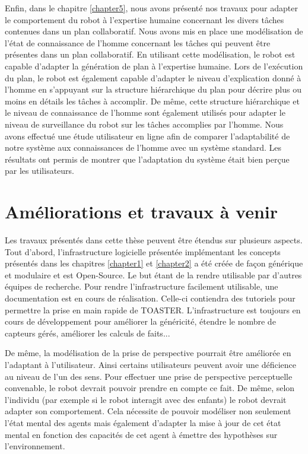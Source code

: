 \documentclass[a4paper,11pt,twoside]{StyleThese}
\begin{document}
Enfin, dans le chapitre \ref{chapter5}, nous avons présenté nos travaux pour adapter le comportement du robot à l'expertise humaine concernant les divers tâches contenues dans un plan collaboratif. Nous avons mis en place une modélisation de l'état de connaissance de l'homme concernant les tâches qui peuvent être présentes dans un plan collaboratif. En utilisant cette modélisation, le robot est capable d'adapter la génération de plan à l'expertise humaine. Lors de l'exécution du plan, le robot est également capable d'adapter le niveau d'explication donné à l'homme en s'appuyant sur la structure hiérarchique du plan pour décrire plus ou moins en détails les tâches à accomplir. De même, cette structure hiérarchique et le niveau de connaissance de l'homme sont également utilisés pour adapter le niveau de surveillance du robot sur les tâches accomplies par l'homme. Nous avons effectué une étude utilisateur en ligne afin de comparer l'adaptabilité de notre système aux connaissances de l'homme avec un système standard. Les résultats ont permis de montrer que l'adaptation du système était bien perçue par les utilisateurs.


\section{Améliorations et travaux à venir}
Les travaux présentés dans cette thèse peuvent être étendus sur plusieurs aspects.
Tout d'abord, l'infrastructure logicielle présentée implémentant les concepts présentés dans les chapitres \ref{chapter1} et \ref{chapter2} a été créée de façon générique et modulaire et est Open-Source. Le but étant de la rendre utilisable par d'autres équipes de recherche. Pour rendre l'infrastructure facilement utilisable, une documentation est en cours de réalisation. Celle-ci contiendra des tutoriels pour permettre la prise en main rapide de TOASTER.
L'infrastructure est toujours en cours de développement pour améliorer la généricité, étendre le nombre de capteurs gérés, améliorer les calculs de faits...

De même, la modélisation de la prise de perspective pourrait être améliorée en l'adaptant à l'utilisateur. Ainsi certains utilisateurs peuvent avoir une déficience au niveau de l'un des sens. Pour effectuer une prise de perspective perceptuelle convenable, le robot devrait pouvoir prendre en compte ce fait.
De même, selon l'individu (par exemple si le robot interagit avec des enfants) le robot devrait adapter son comportement. Cela nécessite de pouvoir modéliser non seulement l'état mental des agents mais également d'adapter la mise à jour de cet état mental en fonction des capacités de cet agent à émettre des hypothèses sur l'environnement.
\end{document}
